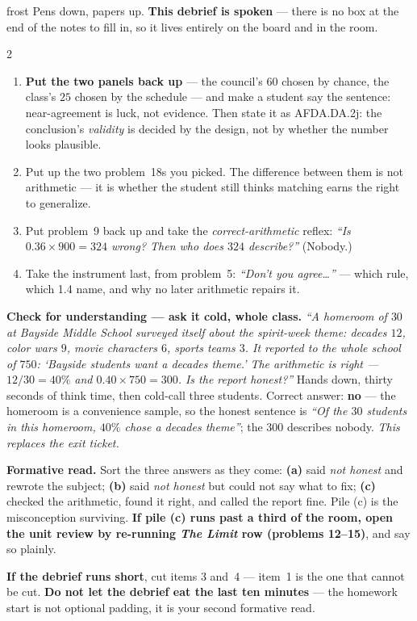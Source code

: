 \documentclass[10pt]{article}
\begin{document}
\boxguard[24]
\begin{skillbox}{frost}
Pens down, papers up. \textbf{This debrief is spoken} --- there is no box at the end of the notes
to fill in, so it lives entirely on the board and in the room.
\begin{multicols}{2}
\begin{enumerate}[leftmargin=1.3em, nosep, itemsep=3pt]
  \item \textbf{Put the two panels back up} --- the council's $60$ chosen by chance, the class's
        $25$ chosen by the schedule --- and make a student say the sentence: near-agreement is
        luck, not evidence. Then state it as AFDA.DA.2j: the conclusion's \emph{validity} is
        decided by the design, not by whether the number looks plausible.
  \item Put up the two problem~18s you picked. The difference between them is not arithmetic ---
        it is whether the student still thinks matching earns the right to generalize.
  \item Put problem~9 back up and take the \emph{correct-arithmetic} reflex: \emph{``Is
        $0.36 \times 900 = 324$ wrong? Then who does $324$ describe?''} (Nobody.)
  \item Take the instrument last, from problem~5: \emph{``Don't you agree\ldots''} --- which rule,
        which 1.4 name, and why no later arithmetic repairs it.
\end{enumerate}
\columnbreak
\textbf{Check for understanding --- ask it cold, whole class.} \emph{``A homeroom of $30$ at
Bayside Middle School surveyed itself about the spirit-week theme: decades $12$, color wars $9$,
movie characters $6$, sports teams $3$. It reported to the whole school of $750$: `Bayside
students want a decades theme.' The arithmetic is right --- $12/30 = 40\%$ and
$0.40 \times 750 = 300$. Is the report honest?''} Hands down, thirty seconds of think time, then
cold-call three students. Correct answer: \textbf{no} --- the homeroom is a convenience sample, so
the honest sentence is \emph{``Of the $30$ students in this homeroom, $40\%$ chose a decades
theme''}; the $300$ describes nobody. \emph{This replaces the exit ticket.}

\textbf{Formative read.} Sort the three answers as they come: \textbf{(a)} said \emph{not honest}
and rewrote the subject; \textbf{(b)} said \emph{not honest} but could not say what to fix;
\textbf{(c)} checked the arithmetic, found it right, and called the report fine. Pile (c) is the
misconception surviving. \textbf{If pile (c) runs past a third of the room, open the unit review
by re-running \emph{The Limit} row (problems 12--15)}, and say so plainly.

\textbf{If the debrief runs short}, cut items 3 and~4 --- item~1 is the one that cannot be cut.
\textbf{Do not let the debrief eat the last ten minutes} --- the homework start is not optional
padding, it is your second formative read.
\end{multicols}
\end{skillbox}
\end{document}
